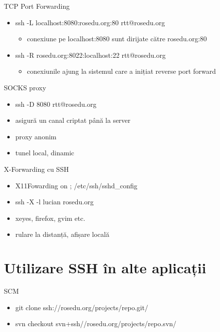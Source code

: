 \documentclass{beamer}
\begin{document}
\begin{frame}{TCP Port Forwarding}
  \begin{itemize}
    \item ssh -L localhost:8080:rosedu.org:80 rtt@rosedu.org
      \begin{itemize}
        \item conexiune pe localhost:8080 sunt dirijate către
rosedu.org:80
      \end{itemize}
    \item ssh -R rosedu.org:8022:localhost:22 rtt@rosedu.org 
       \begin{itemize}
         \item conexiunile ajung la sistemul care a inițiat reverse port
		 forward
       \end{itemize}
  \end{itemize}
\end{frame}

\begin{frame}{SOCKS proxy}
  \begin{itemize}
  	\item ssh -D 8080 rtt@rosedu.org
	\item asigură un canal criptat până la server
	\item proxy anonim
	\item tunel local, dinamic
  \end{itemize}
\end{frame}

\begin{frame}{X-Forwarding cu SSH}
  \begin{itemize}
    \item X11Fowarding on ; /etc/ssh/sshd\_config
    \item ssh -X -l lucian rosedu.org
    \item xeyes, firefox, gvim etc.
    \item rulare la distanță, afișare locală
  \end{itemize}
\end{frame}

\section{Utilizare SSH \^{i}n alte aplicații}
\frame{\tableofcontents[currentsection]}

\begin{frame}{SCM}
  \begin{itemize}
    \item git clone ssh://rosedu.org/projects/repo.git/
    \item svn checkout svn+ssh//rosedu.org/projects/repo.svn/
  \end{itemize}
\end{frame}
\end{document}

